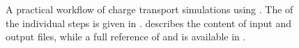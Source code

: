 \begin{figure}
\begin{scriptsize}
\end{scriptsize}
\caption{A practical workflow of charge transport simulations using \votcactp. The  of the individual steps is given in .  describes the content of input and output files, while a full reference of  and  is available in .  }
\label{fig:summary}
\end{figure}
